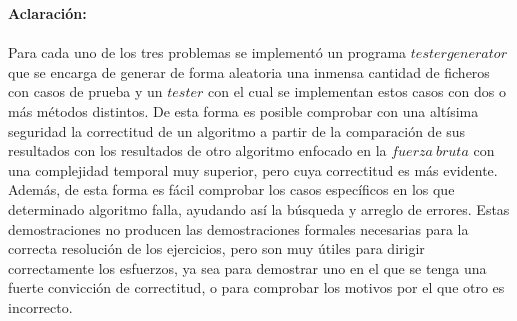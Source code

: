 \documentclass[10pt,letterpaper]{article}
\begin{document}
{ 	\begin{abstract}
 		Primeramente lo atacamos con un algoritmo $fuerza$ $bruta$ exponencial que analiza todas las combinaciones posibles que resultan de distribuir los distintos expertos a tareas, y da la mejor soluci\'on posible. Este algoritmo es ineficiente, por lo cual lo intentamos por otras v\'ias. Una de ellas consist\'ia en hacer una b\'usqueda binaria sobre un predicado de la forma $no,no,no...si,si,si...$ buscando el primer si que responda a la menor cantidad de d\'ias que se requieren para realizar las $n$ tareas, pero result\'o ser un fracaso.Otra soluci\'on consiste en combinar una $mochila$ para obtener subconjuntos de elementos, con un algoritmo cuadr\'atico para determinar la mejor ganancia; este resulta $n^{3}*k$, tambi\'en de costo exponencial ya que depende del valor de k. Una cuarta idea ser\'ia  implementar un algoritmo para, dado un grupo de cient\'ificos fijo v\'alido y las tareas a completar por estos, encontrar la menor cantidad de d\'ias en que pueden lograrlo, de forma polinomial; esta es costosa, pues para determinar dicho grupo tengo que generar todas las combinaciones.\\ \\ \\
 	\end{abstract}
 	
 	{\Large \bf Aclaraci\'on:} \\ \\
 	
 	Para cada uno de los tres problemas se implement\'o un programa $tester generator$ que se encarga de generar de forma aleatoria una inmensa cantidad de ficheros con casos de prueba y un $tester$ con el cual se implementan estos casos con dos o m\'as m\'etodos distintos. De esta forma es posible comprobar con una alt\'isima seguridad la correctitud de un algoritmo a partir de la comparaci\'on de sus resultados con los resultados de otro algoritmo enfocado en la $fuerza \ bruta$ con una complejidad temporal muy superior, pero cuya correctitud es m\'as evidente. Adem\'as, de esta forma es f\'acil comprobar los casos espec\'ificos en los que determinado algoritmo falla, ayudando as\'i la b\'usqueda y arreglo de errores. Estas demostraciones no producen las demostraciones formales necesarias para la correcta resoluci\'on de los ejercicios, pero son muy \'utiles para dirigir correctamente los esfuerzos, ya sea para demostrar uno en el que se tenga una fuerte convicci\'on de correctitud, o para comprobar los motivos por el que otro es incorrecto. \\ \\
 	
}
\end{document}
